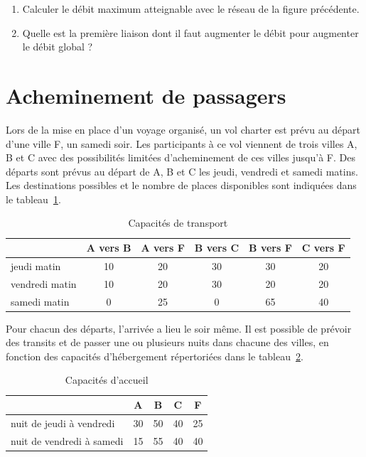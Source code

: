 \documentclass[paper=a4, fontsize=11pt]{scrartcl} %
\numberwithin{equation}{section} %
\numberwithin{figure}{section} %
\numberwithin{table}{section} %
\begin{document}
\begin{enumerate}
\item Calculer le débit maximum atteignable avec le réseau de la figure précédente.
\item Quelle est la première liaison dont il faut augmenter le débit pour augmenter le débit global ?
\end{enumerate}
\section{Acheminement de passagers}

Lors de la mise en place d'un voyage organisé, un vol charter est
prévu au départ d'une ville F, un samedi soir. Les participants à ce
vol viennent de trois villes A, B et C avec des possibilités limitées
d'acheminement de ces villes jusqu'à F. Des départs sont prévus au
départ de A, B et C les jeudi, vendredi et samedi matins. Les
destinations possibles et le nombre de places disponibles sont
indiquées dans le tableau~\ref{tab:vol}.

\begin{table}[htbp]
  \begin{center}
    \begin{tabular}{|l|ccccc|}
      \hline
      & A vers B & A vers F & B vers C & B vers F & C vers F \\
     \hline 
      jeudi matin & 10 & 20 & 30 & 30 & 20 \\
      vendredi matin & 10 & 20 & 30 & 20 & 20 \\
      samedi matin & 0 & 25 & 0 & 65 & 40 \\
      \hline
    \end{tabular}
    \caption{Capacités de transport}
    \label{tab:vol}
  \end{center}
\end{table}

Pour chacun des départs, l'arrivée a lieu le soir même. Il est
possible de prévoir des transits et de passer une ou plusieurs nuits
dans chacune des villes, en fonction des capacités d'hébergement
répertoriées dans le tableau~\ref{tab:nuit}.

\begin{table}[htbp]
  \begin{center}
    \begin{tabular}{|l|cccc|}
      \hline
      & A & B & C & F \\
      \hline
      nuit de jeudi à vendredi & 30 & 50 & 40 & 25 \\
      nuit de vendredi à samedi & 15 & 55 & 40 & 40 \\
      \hline
    \end{tabular}
    \caption{Capacités d'accueil}
    \label{tab:nuit}
  \end{center}
\end{table}
\end{document}
